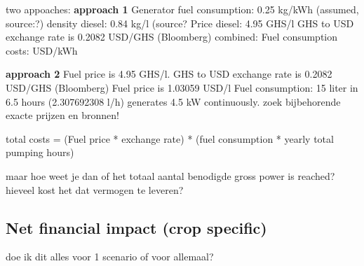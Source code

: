 two appoaches: 
\textbf{approach 1}
Generator fuel consumption: 0.25 kg/kWh (assumed, source:?)
density diesel: 0.84 kg/l (source?
Price diesel: 4.95 GHS/l
GHS to USD exchange rate is 0.2082 USD/GHS (Bloomberg)
combined: Fuel consumption costs: USD/kWh 

\textbf{approach 2}
Fuel price is 4.95 GHS/l. GHS to USD exchange rate is 0.2082 USD/GHS (Bloomberg)
Fuel price is 1.03059 USD/l 
Fuel consumption: 15 liter in 6.5 hours (2.307692308 l/h)
generates 4.5 kW continuously. 
zoek bijbehorende exacte prijzen en bronnen!

total costs = (Fuel price * exchange rate) * (fuel consumption * yearly total pumping hours)

maar hoe weet je dan of het totaal aantal benodigde gross power is reached?
hieveel kost het dat vermogen te leveren? 

\subsection{Net financial impact (crop specific)}

doe ik dit alles voor 1 scenario of voor allemaal? 
